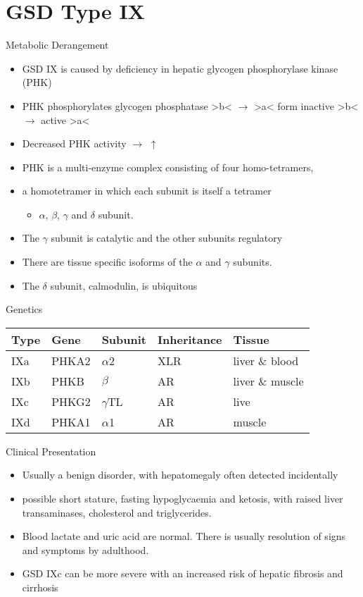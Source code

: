 \documentclass[presentation, smaller]{beamer}
\begin{document}
\section{GSD Type IX}
\label{sec:orgbe402a2}
\begin{frame}[label={sec:orgd4263e2}]{Metabolic Derangement}
\begin{itemize}
\item GSD IX is caused by deficiency in hepatic glycogen phosphorylase kinase (PHK)
\item PHK phosphorylates glycogen phosphatase >b< \(\to\) >a< form
inactive >b< \(\to\)  active >a<
\item Decreased PHK activity \(\to\) \(\uparrow\)
\item PHK is a multi-enzyme complex consisting of four homo-tetramers,
\item a homotetramer in which each subunit is itself a tetramer
\begin{itemize}
\item \(\alpha\), \(\beta\), \(\gamma\) and \(\delta\) subunit.
\end{itemize}
\item The \(\gamma\) subunit is catalytic and the other subunits regulatory
\item There are tissue specific isoforms of the \(\alpha\) and \(\gamma\) subunits.
\item The \(\delta\) subunit, calmodulin, is ubiquitous
\end{itemize}
\end{frame}

\begin{frame}[label={sec:org3e2c227}]{Genetics}
\begin{center}
\begin{tabular}{lllll}
Type & Gene & Subunit & Inheritance & Tissue\\
\hline
IXa & PHKA2 & \(\alpha\)2 & XLR & liver \& blood\\
IXb & PHKB & \(\beta\) & AR & liver \& muscle\\
IXc & PHKG2 & \(\gamma\)TL & AR & live\\
IXd & PHKA1 & \(\alpha\)1 & AR & muscle\\
\end{tabular}
\end{center}
\end{frame}

\begin{frame}[label={sec:orga7e0887}]{Clinical Presentation}
\begin{itemize}
\item Usually a benign disorder, with hepatomegaly often detected
incidentally
\item possible short stature, fasting hypoglycaemia and ketosis, with
raised liver transaminases, cholesterol and triglycerides.
\item Blood lactate and uric acid are normal. There is usually resolution
of signs and symptoms by adulthood.
\item GSD IXc can be more severe with an increased risk of hepatic fibrosis and cirrhosis
\end{itemize}
\end{frame}
\end{document}
